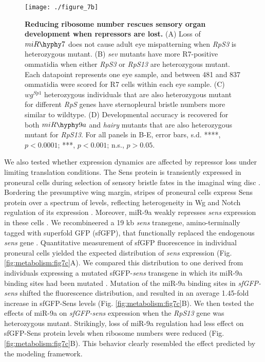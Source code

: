 \begin{figure}[h!]
\centering
\texttt{[image: ./figure\_7b]}
\caption[Reducing ribosome number rescues sensory organ development.]{\textbf{Reducing ribosome number rescues sensory organ development when repressors are lost.} (A) Loss of $miR\hyphy  7$ does not cause adult eye mispatterning when \textit{RpS3} is heterozygous mutant. (B) \textit{sev} mutants have more R7-positive ommatidia when either \textit{RpS3} or \textit{RpS13} are heterozygous mutant. Each datapoint represents one eye sample, and between 481 and 837 ommatidia were scored for R7 cells within each eye sample. (C) $wg^{Sp1}$ heterozygous individuals that are also heterozygous mutant for different \textit{RpS} genes have sternopleural bristle numbers more similar to wildtype. (D) Developmental accuracy is recovered for both $miR\hyphy 9a$ and \textit{hairy} mutants that are also heterozygous mutant for \textit{RpS13}. For all panels in B-E, error bars, s.d. ****, $p<0.0001$; ***, $p<0.001$; n.s., $p>0.05$.}
\label{fig:metabolism:fig7b}
\end{figure}

We also tested whether expression dynamics are affected by repressor loss under limiting translation conditions. The Sens protein is transiently expressed in proneural cells during selection of sensory bristle fates in the imaginal wing disc \cite{Nolo2000}. Bordering the presumptive wing margin, stripes of proneural cells express Sens protein over a spectrum of levels, reflecting heterogeneity in Wg and Notch regulation of its expression \cite{JafarNejad2006,Quan2005}. Moreover, miR-9a weakly represses \textit{sens} expression in these cells \cite{Li2006}. We recombineered a 19 kb \textit{sens} transgene, amino-terminally tagged with superfold GFP (sfGFP), that functionally replaced the endogenous \textit{sens} gene \cite{Cassidy2013,Venken2006}. Quantitative measurement of sfGFP fluorescence in individual proneural cells yielded the expected distribution of \textit{sens} expression (Fig. \ref{fig:metabolism:fig7c}A). We compared this distribution to one derived from individuals expressing a mutated sfGFP-\textit{sens} transgene in which its miR-9a binding sites had been mutated \cite{Cassidy2013}. Mutation of the miR-9a binding sites in \textit{sfGFP-sens} shifted the fluorescence distribution, and resulted in an average 1.45-fold increase in sfGFP-Sens levels (Fig. \ref{fig:metabolism:fig7c}B). We then tested the effects of miR-9a on \textit{sfGFP-sens} expression when the \textit{RpS13} gene was heterozygous mutant. Strikingly, loss of miR-9a regulation had less effect on sfGFP-Sens protein levels when ribosome numbers were reduced (Fig. \ref{fig:metabolism:fig7c}B). This behavior clearly resembled the effect predicted by the modeling framework.

